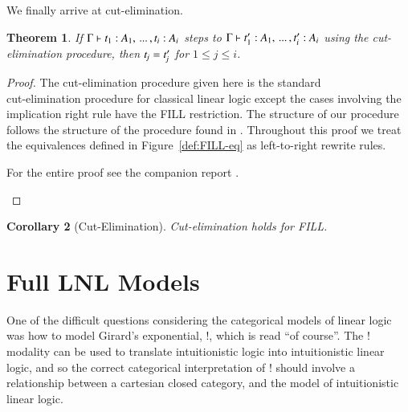 \documentclass{elsarticle}
\newtheorem{theorem}{Theorem}
\newtheorem{corollary}[theorem]{Corollary}
\begin{document}
We finally arrive at cut-elimination.
\begin{theorem}
  \label{thm:cut-pro}
  If $ \Gamma  \vdash  \mathit{t_{{\mathrm{1}}}}  :  \mathit{A_{{\mathrm{1}}}}  , \, ... \, ,  \mathit{t_{\mathit{i}}}  :  \mathit{A_{\mathit{i}}} $ steps to $ \Gamma  \vdash  \mathit{t'_{{\mathrm{1}}}}  :  \mathit{A_{{\mathrm{1}}}}  , \, ... \, ,  \mathit{t'_{\mathit{i}}}  :  \mathit{A_{\mathit{i}}} $ using the cut-elimination procedure, then $\mathit{t_{\mathit{j}}}  =  \mathit{t'_{\mathit{j}}}$
  for $1 \leq j \leq i$.
\end{theorem}
\begin{proof}
  The cut-elimination procedure given here is the standard\\
  cut-elimination procedure for classical linear logic except the
  cases involving the implication right rule have the FILL
  restriction. The structure of our procedure follows the structure of
  the procedure found in \cite{Mellies:2009}. Throughout this proof we
  treat the equivalences defined in Figure~\ref{def:FILL-eq} as
  left-to-right rewrite rules. \begin{paper} For the entire proof see
    the companion report \cite{Eades:2015}.\end{paper}
  
\end{proof}

\begin{corollary}[Cut-Elimination]
  \label{corollary:cut-elimination}
  Cut-elimination holds for FILL.
\end{corollary}

\section{Full LNL Models}
\label{sec:full_lnl_models}
One of the difficult questions considering the categorical models of
linear logic was how to model Girard's exponential, $!$, which is read
``of course''.  The $!$ modality can be used to translate
intuitionistic logic into intuitionistic linear logic, and so the
correct categorical interpretation of $!$ should involve a
relationship between a cartesian closed category, and the model of
intuitionistic linear logic.
\end{document}
